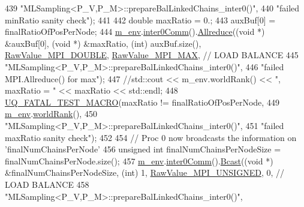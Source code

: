\begin{DoxyCode}
439                       \textcolor{stringliteral}{"MLSampling<P\_V,P\_M>::prepareBalLinkedChains\_inter0()"},
440                       \textcolor{stringliteral}{"failed minRatio sanity check"});
441 
442   \textcolor{keywordtype}{double} maxRatio = 0.;
443   auxBuf[0] = finalRatioOfPosPerNode;
444   \hyperlink{class_q_u_e_s_o_1_1_m_l_sampling_a13f1ca4fe9f94822fe572a743eaced1d}{m\_env}.\hyperlink{class_q_u_e_s_o_1_1_base_environment_a689e4d140c74d495d97eb498714a4b82}{inter0Comm}().\hyperlink{class_q_u_e_s_o_1_1_mpi_comm_a72e137e60ef8060efb1ee5fc874fa4b8}{Allreduce}((\textcolor{keywordtype}{void} *) &auxBuf[0], (\textcolor{keywordtype}{void} *) &maxRatio, (\textcolor{keywordtype}{int}) 
      auxBuf.size(), \hyperlink{_mpi_comm_8h_ad0f503bd9fecfe4e570ca3d15aaf2518}{RawValue\_MPI\_DOUBLE}, \hyperlink{_mpi_comm_8h_a68f3ac7ff71a6504e236b0c95de78178}{RawValue\_MPI\_MAX}, \textcolor{comment}{// LOAD BALANCE}
445                                \textcolor{stringliteral}{"MLSampling<P\_V,P\_M>::prepareBalLinkedChains\_inter0()"},
446                                \textcolor{stringliteral}{"failed MPI.Allreduce() for max"});
447   \textcolor{comment}{//std::cout << m\_env.worldRank() << ", maxRatio = " << maxRatio << std::endl;}
448   \hyperlink{_defines_8h_a56d63d18d0a6d45757de47fcc06f574d}{UQ\_FATAL\_TEST\_MACRO}(maxRatio != finalRatioOfPosPerNode,
449                       \hyperlink{class_q_u_e_s_o_1_1_m_l_sampling_a13f1ca4fe9f94822fe572a743eaced1d}{m\_env}.\hyperlink{class_q_u_e_s_o_1_1_base_environment_a78b57112bbd0e6dd0e8afec00b40ffa7}{worldRank}(),
450                       \textcolor{stringliteral}{"MLSampling<P\_V,P\_M>::prepareBalLinkedChains\_inter0()"},
451                       \textcolor{stringliteral}{"failed maxRatio sanity check"});
452 
454   \textcolor{comment}{// Proc 0 now broadcasts the information on 'finalNumChainsPerNode'}
456 \textcolor{comment}{}  \textcolor{keywordtype}{unsigned} \textcolor{keywordtype}{int} finalNumChainsPerNodeSize = finalNumChainsPerNode.size();
457   \hyperlink{class_q_u_e_s_o_1_1_m_l_sampling_a13f1ca4fe9f94822fe572a743eaced1d}{m\_env}.\hyperlink{class_q_u_e_s_o_1_1_base_environment_a689e4d140c74d495d97eb498714a4b82}{inter0Comm}().\hyperlink{class_q_u_e_s_o_1_1_mpi_comm_abd6af8db8b0c7fd2f5b62e26477a9537}{Bcast}((\textcolor{keywordtype}{void} *) &finalNumChainsPerNodeSize, (\textcolor{keywordtype}{int}) 1, 
      \hyperlink{_mpi_comm_8h_a06cbfbc33436f6e0dc8a48ff3c49bdfc}{RawValue\_MPI\_UNSIGNED}, 0, \textcolor{comment}{// LOAD BALANCE}
458                            \textcolor{stringliteral}{"MLSampling<P\_V,P\_M>::prepareBalLinkedChains\_inter0()"},

\end{DoxyCode}
